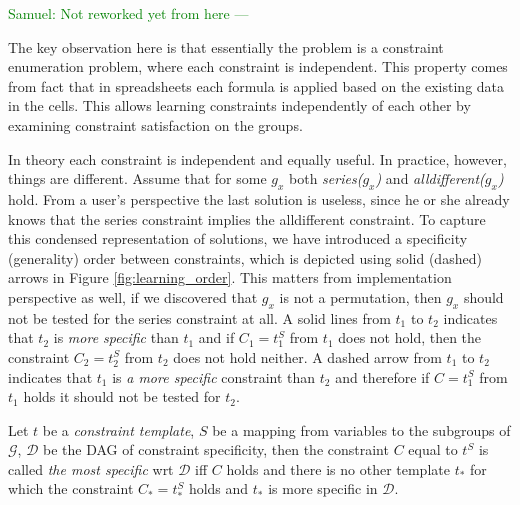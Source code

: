 \documentclass{ecai}
\newcommand{\samuel}[1]{\textcolor{green}{{\sc Samuel:} #1}\xspace}
\newcommand{\constraints}{\ensuremath{\mathcal{T}}\xspace}
\newcommand{\format}[1]{\textit{#1}\xspace}
\newcommand{\template}{\format{constraint template}}
\newcommand{\dependencies}{\ensuremath{\mathcal{D}}\xspace}
\newcommand{\groups}{\ensuremath{\mathcal{G}}\xspace}
\newcommand{\luc}[1]{{\textcolor{red}{#1}}}
\begin{document}

\samuel{Not reworked yet from here ---}

  The key observation here is that essentially the problem is a constraint enumeration problem, where each constraint is independent. This property comes from fact that in spreadsheets each formula is applied based on the existing data in the cells. This allows learning constraints independently of each other by examining constraint satisfaction on the groups.


  In theory each constraint is independent and equally useful. In practice, however, things are different. Assume that for some $g_x$ both \textit{series($g_x$)} and \textit{alldifferent($g_x$)} hold. From a user's perspective the last solution is useless, since he or she already knows that the series constraint implies the alldifferent constraint. To capture this condensed representation \cite{condensed} of solutions, we have introduced a specificity (generality) order between constraints, which is depicted using solid (dashed) arrows in Figure \ref{fig:learning_order}. This matters from implementation perspective as well, if we discovered that $g_x$ is not a permutation, then $g_x$ should not be tested for the series constraint at all. A solid lines from $t_1$ to $t_2$ indicates that $t_2$ is \textit{more specific} than $t_1$ and if $C_1=t_1^S$ from $t_1$ does not hold, then the constraint $C_2=t_2^S$ from $t_2$ does not hold neither. A dashed arrow from $t_1$ to $t_2$ indicates that $t_1$ is \textit{a more specific} constraint than $t_2$ and therefore if $C=t_1^S$ from $t_1$ holds it should not be tested for $t_2$.


Let $t$ be a \template, $S$ be a mapping from variables to the subgroups of \groups, \dependencies be the DAG of constraint specificity, then the constraint $C$ equal to $t^S$ is called \textit{the most specific} wrt \dependencies iff $C$ holds and there is no other template $t_{*}$ for which the constraint $C_{*}=t_{*}^S$ holds and $t_{*}$ is more specific in \dependencies.
\end{document}
